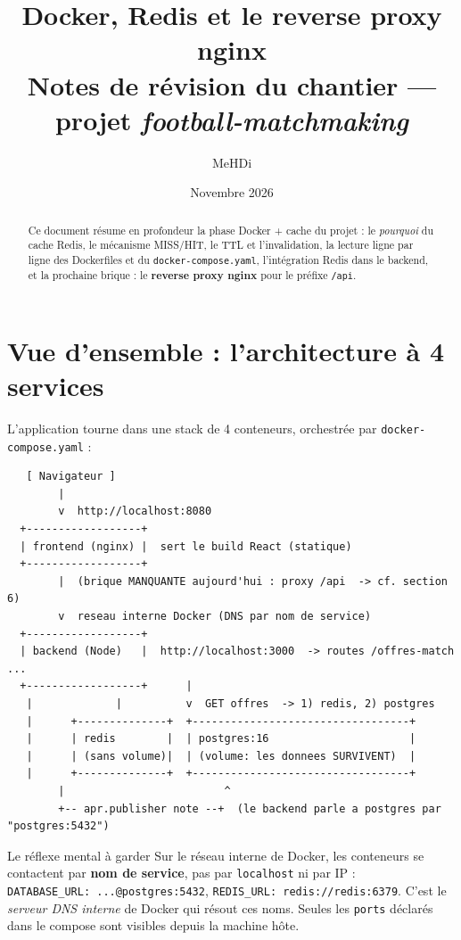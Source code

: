 \documentclass[11pt,a4paper]{article}
\title{\textbf{Docker, Redis et le reverse proxy nginx}\\
\large Notes de révision du chantier --- projet \emph{football-matchmaking}}
\author{MeHDi}
\date{Novembre 2026}
\begin{document}
\maketitle

\begin{abstract}
Ce document résume en profondeur la phase \og Docker + cache \fg{} du projet :
le \emph{pourquoi} du cache Redis, le mécanisme MISS/HIT, le TTL et l'invalidation,
la lecture ligne par ligne des Dockerfiles et du \texttt{docker-compose.yaml},
l'intégration Redis dans le backend, et la prochaine brique : le
\textbf{reverse proxy nginx} pour le préfixe \texttt{/api}.
\end{abstract}

\tableofcontents
\bigskip

\section{Vue d'ensemble : l'architecture à 4 services}

L'application tourne dans une stack de 4 conteneurs, orchestrée par
\texttt{docker-compose.yaml} :

\begin{verbatim}
   [ Navigateur ]
        |
        v  http://localhost:8080
  +------------------+
  | frontend (nginx) |  sert le build React (statique)
  +------------------+
        |  (brique MANQUANTE aujourd'hui : proxy /api  -> cf. section 6)
        v  reseau interne Docker (DNS par nom de service)
  +------------------+
  | backend (Node)   |  http://localhost:3000  -> routes /offres-match ...
  +------------------+      |
   |             |          v  GET offres  -> 1) redis, 2) postgres
   |      +--------------+  +----------------------------------+
   |      | redis        |  | postgres:16                      |
   |      | (sans volume)|  | (volume: les donnees SURVIVENT)  |
   |      +--------------+  +----------------------------------+
        |                         ^
        +-- apr.publisher note --+  (le backend parle a postgres par "postgres:5432")
\end{verbatim}

\begin{conceptbox}{Le réflexe mental à garder}
Sur le réseau interne de Docker, les conteneurs se contactent par
\textbf{nom de service}, pas par \texttt{localhost} ni par IP :
\texttt{DATABASE\_URL:~...@postgres:5432}, \texttt{REDIS\_URL:~redis://redis:6379}.
C'est le \emph{serveur DNS interne} de Docker qui résout ces noms.
Seules les \texttt{ports} déclarés dans le compose sont visibles depuis la machine hôte.
\end{conceptbox}
\end{document}
